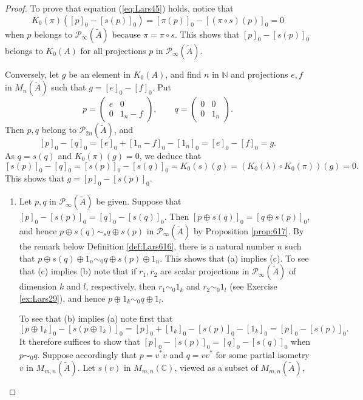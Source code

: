 \documentclass{book}
\begin{document}
\begin{proof}
  To prove that equation (\ref{eq:Lars45}) holds, notice that
  \[
    K_0(\pi)({[p]}_0-{[s(p)]}_0)={[\pi(p)]}_0-{[(\pi\circ s)(p)]}_0=0
  \]
  when \(p\) belongs to \(\mathcal{P}_\infty(\tilde{A})\) because \(\pi=\pi\circ s\). This shows that \({[p]}_0-{[s(p)]}_0\)
  belongs to \(K_0(A)\) for all projections \(p\) in \(\mathcal{P}_\infty(\tilde{A})\).\par
  Conversely, let \(g\) be an element in \(K_0(A)\), and find \(n\) in \(\mathbb{N}\) and projections \(e,f\) in \(M_n(\tilde{A})\) such that \(g={[e]}_0-{[f]}_0\). Put
  \[
    p=\begin{pmatrix}
      e&0\\0&1_n-f
    \end{pmatrix},\qquad
    q=\begin{pmatrix}
      0&0\\0&1_n
    \end{pmatrix}.
  \]
  Then \(p,q\) belong to \(\mathcal{P}_{2n}(\tilde{A})\), and
  \[
    {[p]}_0-{[q]}_0={[e]}_0+{[1_n-f]}_0-{[1_n]}_0={[e]}_0-{[f]}_0=g.
  \]
  As \(q=s(q)\) and \(K_0(\pi)(g)=0\), we deduce that
  \[
    {[s(p)]}_0-{[q]}_0={[s(p)]}_0-{[s(q)]}_0=K_0(s)(g)=(K_0(\lambda)\circ K_0(\pi))(g)=0.
  \]
  This shows that \(g={[p]}_0-{[s(p)]}_0\).
  \begin{enumerate}
    \item Let \(p,q\) in \(\mathcal{P}_\infty(\tilde{A})\) be given. Suppose that \({[p]}_0-{[s(p)]}_0={[q]}_0-{[s(q)]}_0\).
      Then \({[p\oplus s(q)]}_0={[q\oplus s(p)]}_0\), and hence \(p\oplus s(q)\sim_s q\oplus s(p)\) in \(\mathcal{P}_\infty(\tilde{A})\) by
      Proposition \ref{prop:617}. By the remark below Definition \ref{def:Lars616}, there is a natural number \(n\) such that 
      \(p\oplus s(q)\oplus1_n\sim_0 q\oplus s(p)\oplus 1_n\). This shows that (a) implies (c). To see that (c) implies (b) note that
      if \(r_1,r_2\) are scalar projections in \(\mathcal{P}_\infty(\tilde{A})\) of dimension \(k\) and \(l\), respectively, then \(r_1\sim_0 1_k\) and \(r_2\sim_0 1_l\)
      (see Exercise \ref{ex:Lars29}), and hence \(p\oplus 1_k\sim_0 q\oplus1_l\).\par
      To see that (b) implies (a) note first that
      \[
        {[p\oplus 1_k]}_0-{[s(p\oplus1_k)]}_0={[p]}_0+{[1_k]}_0-{[s(p)]}_0-{[1_k]}_0={[p]}_0-{[s(p)]}_0.
      \]
      It therefore suffices to show that \({[p]}_0-{[s(p)]}_0={[q]}_0-{[s(q)]}_0\) when \(p\sim_0 q\).
      Suppose accordingly that \(p=v^*v\) and \(q=vv^*\) for some partial isometry \(v\) in \(M_{m,n}(\tilde{A})\). Let \(s(v)\) in \(M_{m,n}(\mathbb{C})\), viewed as a subset of \(M_{m,n}(\tilde{A})\), 

\end{enumerate}
\end{proof}
\end{document}
